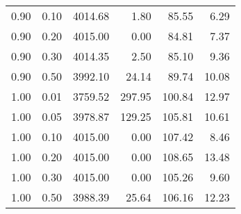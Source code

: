 \begin{table}
\begin{tabular}{rrrrrr}
0.90 & 0.10 & 4014.68 & 1.80 & 85.55 & 6.29 \\
0.90 & 0.20 & 4015.00 & 0.00 & 84.81 & 7.37 \\
0.90 & 0.30 & 4014.35 & 2.50 & 85.10 & 9.36 \\
0.90 & 0.50 & 3992.10 & 24.14 & 89.74 & 10.08 \\
1.00 & 0.01 & 3759.52 & 297.95 & 100.84 & 12.97 \\
1.00 & 0.05 & 3978.87 & 129.25 & 105.81 & 10.61 \\
1.00 & 0.10 & 4015.00 & 0.00 & 107.42 & 8.46 \\
1.00 & 0.20 & 4015.00 & 0.00 & 108.65 & 13.48 \\
1.00 & 0.30 & 4015.00 & 0.00 & 105.26 & 9.60 \\
1.00 & 0.50 & 3988.39 & 25.64 & 106.16 & 12.23 \\
\bottomrule
\end{tabular}
\end{table}
